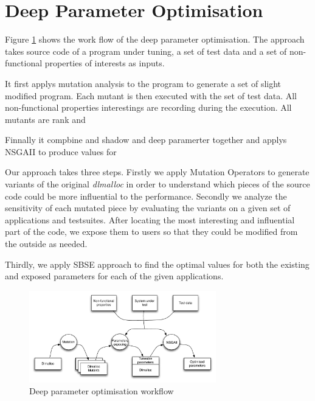\section{Deep Parameter Optimisation}

Figure \ref{system} shows the work flow of the deep parameter optimisation. The approach takes source code of a program under tuning, a set of test data and a set of non-functional properties of interests as inputs. 


It first applys mutation analysis to the program to generate a set of slight modified program. Each mutant is then executed with the set of test data.  All non-functional properties interestings are recording during the execution. All mutants are rank and 

Finnally it compbine and shadow and deep paramerter together and applys NSGAII to produce values for



Our approach takes three steps. Firstly we apply Mutation Operators to generate variants of the original \emph{dlmalloc} in order to understand which pieces of the source code could be more influential to the performance. Secondly we analyze the sensitivity of each mutated piece by evaluating the variants on a given set of applications and testsuites. After locating the most interesting and influential part of the code, we expose them to users so that they could be modified from the outside as needed. 

Thirdly, we apply SBSE approach to find the optimal values for both the existing and exposed parameters for each of the given applications.

\begin{figure}[htbp]
\centering
\includegraphics[width=3.2in]{pics/system}
\caption{Deep parameter optimisation workflow}\label{system}
\end{figure}



